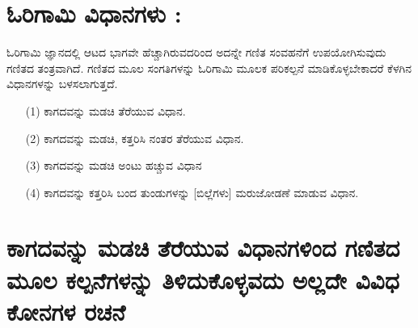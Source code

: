 \section{ಓರಿಗಾಮಿ ವಿಧಾನಗಳು : }\label{sec1.7} %
ಓರಿಗಾಮಿ ಜ್ಞಾನದಲ್ಲಿ ಆಟದ ಭಾಗವೇ ಹೆಚ್ಚಾಗಿರುವದರಿಂದ ಅದನ್ನೇ ಗಣಿತ ಸಂವಹನೆಗೆ ಉಪಯೋಗಿಸುವುದು ಗಣಿತದ ತಂತ್ರವಾಗಿದೆ. ಗಣಿತದ ಮೂಲ ಸಂಗತಿಗಳನ್ನು ಓರಿಗಾಮಿ ಮೂಲಕ ಪರಿಕಲ್ಪನೆ ಮಾಡಿಕೊಳ್ಳಬೇಕಾದರೆ ಕೆಳಗಿನ ವಿಧಾನಗಳನ್ನು ಬಳಸಲಾಗುತ್ತದೆ. 
\smallskip
\begin{itemize}
\item[(1)] ಕಾಗದವನ್ನು ಮಡಚಿ ತೆರೆಯುವ ವಿಧಾನ.
\smallskip
\item[(2)] ಕಾಗದವನ್ನು ಮಡಚಿ, ಕತ್ತರಿಸಿ ನಂತರ ತೆರೆಯುವ ವಿಧಾನ.
\smallskip
\item[(3)] ಕಾಗದವನ್ನು ಮಡಚಿ ಅಂಟು ಹಚ್ಚುವ ವಿಧಾನ
\smallskip
\item[(4)] ಕಾಗದವನ್ನು ಕತ್ತರಿಸಿ ಬಂದ ತುಂಡುಗಳನ್ನು [ಬಿಲ್ಲೆಗಳು] ಮರುಜೋಡಣೆ ಮಾಡುವ ವಿಧಾನ.
\end{itemize}

\section{ಕಾಗದವನ್ನು ಮಡಚಿ ತೆರೆಯುವ ವಿಧಾನಗಳಿಂದ ಗಣಿತದ ಮೂಲ ಕಲ್ಪನೆಗಳನ್ನು ತಿಳಿದುಕೊಳ್ಳವದು ಅಲ್ಲದೇ ವಿವಿಧ ಕೋನಗಳ ರಚನೆ}\label{sec1.8}%

